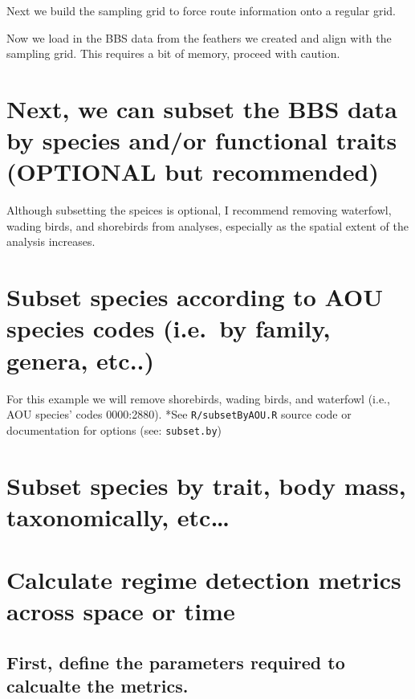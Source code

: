 \documentclass[12pt,twoside,openany]{reedthesis}
\begin{document}
Next we build the sampling grid to force route information onto a regular grid.

Now we load in the BBS data from the feathers we created and align with the sampling grid. This requires a bit of memory, proceed with caution.

\hypertarget{next-we-can-subset-the-bbs-data-by-species-andor-functional-traits-optional-but-recommended}{%
\section{Next, we can subset the BBS data by species and/or functional traits (OPTIONAL but recommended)}\label{next-we-can-subset-the-bbs-data-by-species-andor-functional-traits-optional-but-recommended}}

Although subsetting the speices is optional, I recommend removing waterfowl, wading birds, and shorebirds from analyses, especially as the spatial extent of the analysis increases.

\hypertarget{subset-species-according-to-aou-species-codes-i.e.-by-family-genera-etc..}{%
\section{Subset species according to AOU species codes (i.e.~by family, genera, etc..)}\label{subset-species-according-to-aou-species-codes-i.e.-by-family-genera-etc..}}

For this example we will remove shorebirds, wading birds, and waterfowl (i.e., AOU species' codes 0000:2880). *See \texttt{R/subsetByAOU.R} source code or documentation for options (see: \texttt{subset.by})

\hypertarget{subset-species-by-trait-body-mass-taxonomically-etc}{%
\section{Subset species by trait, body mass, taxonomically, etc\ldots{}}\label{subset-species-by-trait-body-mass-taxonomically-etc}}

\hypertarget{calculate-regime-detection-metrics-across-space-or-time}{%
\section{Calculate regime detection metrics across space or time}\label{calculate-regime-detection-metrics-across-space-or-time}}

\hypertarget{first-define-the-parameters-required-to-calcualte-the-metrics.}{%
\subsection{First, define the parameters required to calcualte the metrics.}\label{first-define-the-parameters-required-to-calcualte-the-metrics.}}
\end{document}
